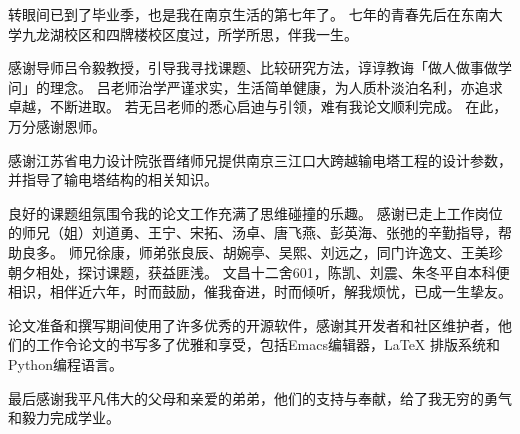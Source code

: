 
转眼间已到了毕业季，也是我在南京生活的第七年了。
七年的青春先后在东南大学九龙湖校区和四牌楼校区度过，所学所思，伴我一生。

感谢导师吕令毅教授，引导我寻找课题、比较研究方法，谆谆教诲「做人做事做学问」的理念。
吕老师治学严谨求实，生活简单健康，为人质朴淡泊名利，亦追求卓越，不断进取。
若无吕老师的悉心启迪与引领，难有我论文顺利完成。
在此，万分感谢恩师。

感谢江苏省电力设计院张晋绪师兄提供南京三江口大跨越输电塔工程的设计参数，
并指导了输电塔结构的相关知识。

良好的课题组氛围令我的论文工作充满了思维碰撞的乐趣。
感谢已走上工作岗位的师兄（姐）刘道勇、王宁、宋拓、汤卓、唐飞燕、彭英海、张弛的辛勤指导，帮助良多。
师兄徐康，师弟张良辰、胡婉亭、吴熙、刘远之，同门许逸文、王美珍朝夕相处，探讨课题，获益匪浅。
文昌十二舍601，陈凯、刘震、朱冬平自本科便相识，相伴近六年，时而鼓励，催我奋进，时而倾听，解我烦忧，已成一生挚友。

论文准备和撰写期间使用了许多优秀的开源软件，感谢其开发者和社区维护者，他们的工作令论文的书写多了优雅和享受，包括Emacs编辑器，{\LaTeX} 排版系统和Python编程语言。

最后感谢我平凡伟大的父母和亲爱的弟弟，他们的支持与奉献，给了我无穷的勇气和毅力完成学业。

